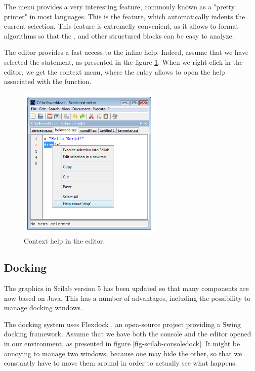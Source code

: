 The  menu provides a very interesting feature, commonly
known as a "pretty printer" in most languages. This is the 
 feature, which automatically
indents the current selection. This feature is extremelly convenient,
as it allows to format algorithms so that the , 
 and other structured blocks can be 
easy to analyze.

The editor provides a fast access to the inline help. 
Indeed, assume that we have selected the  statement, 
as presented in the figure \ref{fig-scilab-contexthelp}. 
When we right-click in the editor, we get the context menu,
where the  entry allows to open the help associated with the  
function.

\begin{figure}
\begin{center}
\includegraphics[width=7cm]{introscilab/editor-help.png}
\end{center}
\caption{Context help in the editor.}
\label{fig-scilab-contexthelp}
\end{figure}

\subsection{Docking}
The graphics in Scilab version 5 has been updated so that many 
components are now based on Java. This has a number of advantages,
including the possibility to manage docking windows.

The docking system uses Flexdock \cite{FlexdockWWW}, an open-source project 
providing a Swing docking framework. Assume that we have both the 
console and the editor opened in our environment, as presented in figure 
\ref{fig-scilab-consoledock}. It might be annoying to manage two 
windows, because one may hide the other, so that we constantly have 
to move them around in order to actually see what happens. 

